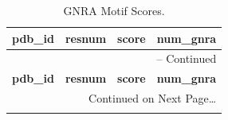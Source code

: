 \begin{center}
\begin{longtable}{c|c|c|c}
\caption{GNRA Motif Scores.}
\label{tab:gnrascores}\\
\bf{pdb\_id} & \bf{resnum} & \bf{score} &
\bf{num\_gnra}   \\  \hline \hline
\endfirsthead

\multicolumn{4}{r}{{\tablename} \thetable{} -- Continued} \\
\bf{pdb\_id} & \bf{resnum} & \bf{score} &
\bf{num\_gnra} \\  \hline \hline

\endhead

\multicolumn{4}{r}{Continued on Next Page\ldots} \\
\endfoot
\endlastfoot


\end{longtable}
\end{center}
